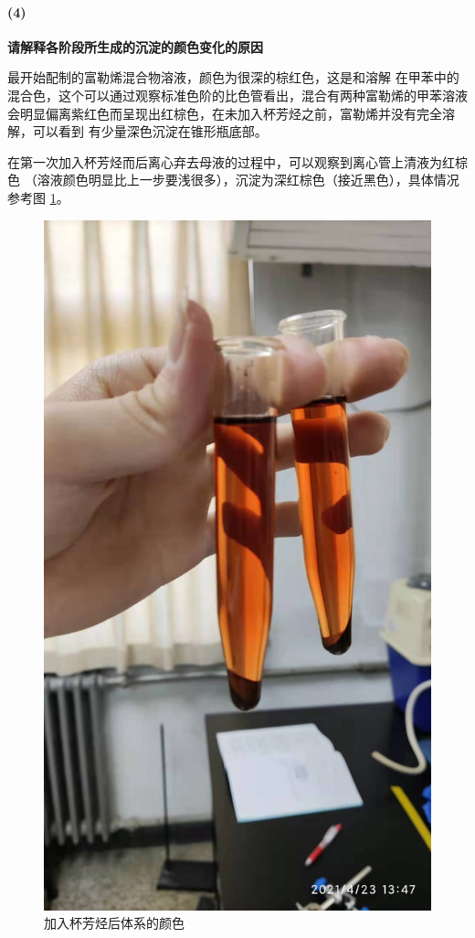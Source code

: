 \documentclass[a4paper,zihao=5,UTF8]{ctexart}
\begin{document}
    \paragraph{(4)}\textbf{请解释各阶段所生成的沉淀的颜色变化的原因}
    \par 
    最开始配制的富勒烯混合物溶液，颜色为很深的棕红色，这是和溶解
    在甲苯中的混合色，这个可以通过观察标准色阶的比色管看出，混合有两种富勒烯的甲苯溶液
    会明显偏离紫红色而呈现出红棕色，在未加入杯芳烃之前，富勒烯并没有完全溶解，可以看到
    有少量深色沉淀在锥形瓶底部。
    \par 
    在第一次加入杯芳烃而后离心弃去母液的过程中，可以观察到离心管上清液为红棕色
    （溶液颜色明显比上一步要浅很多），沉淀为深红棕色（接近黑色），具体情况参考图
    \ref{color}。
    \begin{figure}[htbp]
        \centering
        \includegraphics[scale=0.15]{color.jpg}
        \caption{加入杯芳烃后体系的颜色}
        \label{color}
    \end{figure}
\end{document}
